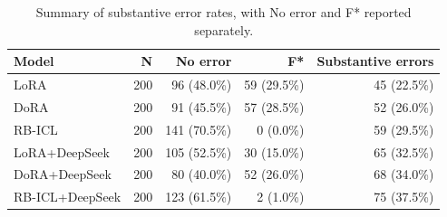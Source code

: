 \begin{table}[htbp]
\centering
\small
\begin{tabular}{lrrrr}
\toprule
Model & N & No error & F* & Substantive errors \\
\midrule
LoRA & 200 & 96 (48.0\%) & 59 (29.5\%) & 45 (22.5\%) \\
DoRA & 200 & 91 (45.5\%) & 57 (28.5\%) & 52 (26.0\%) \\
RB-ICL & 200 & 141 (70.5\%) & 0 (0.0\%) & 59 (29.5\%) \\
LoRA+DeepSeek & 200 & 105 (52.5\%) & 30 (15.0\%) & 65 (32.5\%) \\
DoRA+DeepSeek & 200 & 80 (40.0\%) & 52 (26.0\%) & 68 (34.0\%) \\
RB-ICL+DeepSeek & 200 & 123 (61.5\%) & 2 (1.0\%) & 75 (37.5\%) \\
\bottomrule
\end{tabular}
\caption{Summary of substantive error rates, with No error and F* reported separately.}
\label{tab:substantive_error_rates}
\end{table}
